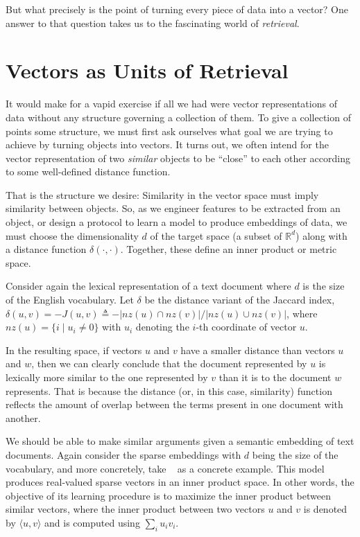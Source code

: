 But what precisely is the point of turning every piece of data into a vector?
One answer to that question takes us to the fascinating world of \emph{retrieval}.

\section{Vectors as Units of Retrieval}

It would make for a vapid exercise if all we had were vector representations of data
without any structure governing a collection of them.
To give a collection of points some structure, we must first ask ourselves what goal
we are trying to achieve by turning objects into vectors.
It turns out, we often intend for the vector representation of two \emph{similar} objects to
be ``close'' to each other according to some well-defined distance function.

That is the structure we desire: Similarity in the vector space must imply similarity
between objects. So, as we engineer features to be extracted from an object, or
design a protocol to learn a model to produce embeddings of data,
we must choose the dimensionality $d$ of the target space
(a subset of $\mathbb{R}^d$) along with a distance function $\delta(\cdot, \cdot)$.
Together, these define an inner product or metric space.

\bigskip

Consider again the lexical representation of a text document
where $d$ is the size of the English vocabulary. Let $\delta$ be the
distance variant of the Jaccard index,
$\delta(u, v) = - J(u, v) \triangleq - \lvert \mathit{nz}(u) \cap \mathit{nz}(v) \rvert / \lvert \mathit{nz}(u) \cup \mathit{nz}(v) \rvert$,
where $\mathit{nz}(u) = \{ i \;|\; u_i \neq 0 \}$ with $u_i$ denoting the $i$-th
coordinate of vector $u$.

In the resulting space, if vectors $u$ and $v$ have a smaller distance
than vectors $u$ and $w$,
then we can clearly conclude that the document represented by $u$ is lexically
more similar to the one represented by $v$ than it is to the document $w$ represents.
That is because the distance (or, in this case, similarity) function reflects
the amount of overlap between the terms present in one document with another.

\bigskip

We should be able to make similar arguments given a semantic embedding of text documents.
Again consider the sparse embeddings with $d$ being the size of the vocabulary,
and more concretely, take \splade{}~\citep{formal2021splade} as a concrete example.
This model produces real-valued sparse vectors in an inner product space.
In other words, the objective of its learning procedure is to
maximize the inner product between similar vectors,
where the inner product between two vectors $u$ and $v$ is
denoted by $\langle u, v \rangle$ and is computed using $\sum_i u_i v_i$.

